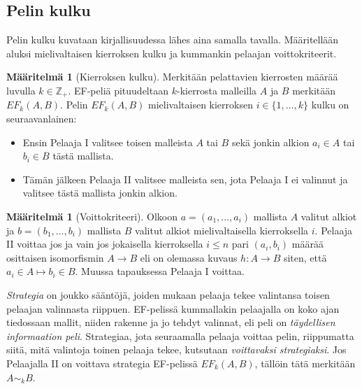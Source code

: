 \documentclass[finnish]{tktltiki2}
\theoremstyle{definition}
\newtheorem{maar}[lau]{Määritelmä}
\theoremstyle{remark}
\begin{document}
\subsection{Pelin kulku}
Pelin kulku kuvataan kirjallisuudessa lähes aina samalla tavalla. Määritellään aluksi mielivaltaisen kierroksen kulku ja kummankin pelaajan voittokriteerit.

\begin{maar}[Kierroksen kulku]
Merkitään pelattavien kierrosten määrää luvulla $k \in \mathbb{Z}_+$. EF-peliä pituudeltaan $k$-kierrosta malleilla $A$ ja $B$ merkitään $EF_k(A, B)$. Pelin $EF_k(A, B)$ mielivaltaisen kierroksen $i \in \{1, \ldots, k\}$ kulku on seuraavanlainen: 
\begin{itemize}
\item Ensin Pelaaja I valitsee toisen malleista $A$ tai $B$ sekä jonkin alkion $a_i \in A$ tai $b_i \in B$ tästä mallista.
\item Tämän jälkeen Pelaaja II valitsee malleista sen, jota Pelaaja I ei valinnut ja valitsee tästä mallista jonkin alkion.
\end{itemize}
\end{maar}

\begin{maar}[Voittokriteeri]
Olkoon $a = (a_1, \ldots, a_i)$ mallista $A$ valitut alkiot ja $b = (b_1, \ldots, b_i)$ mallista $B$ valitut alkiot mielivaltaisella kierroksella $i$. Pelaaja II voittaa jos ja vain jos jokaisella kierroksella $i \leq n$ pari $(a_i, b_i)$ määrää osittaisen isomorfismin $A \rightarrow B$ eli on olemassa kuvaus $h: A \rightarrow B$ siten, että $a_i \in A \mapsto b_i \in B$. Muussa tapauksessa Pelaaja I voittaa.
\end{maar}

\textit{Strategia} on joukko sääntöjä, joiden mukaan pelaaja tekee valintansa toisen pelaajan valinnasta riippuen. EF-pelissä kummallakin pelaajalla on koko ajan tiedossaan mallit, niiden rakenne ja jo tehdyt valinnat, eli peli on \textit{täydellisen informaation peli}. Strategiaa, jota seuraamalla pelaaja voittaa pelin, riippumatta siitä, mitä valintoja toinen pelaaja tekee, kutsutaan \textit{voittavaksi strategiaksi}. Jos Pelaajalla II on voittava strategia EF-pelissä $EF_k(A, B)$, tällöin tätä merkitään $A \sim_k B$.
\end{document}
